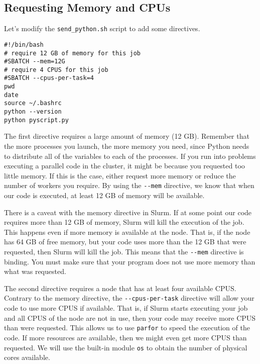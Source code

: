\documentclass[12pt, a4paper]{article}
\begin{document}
\subsection{Requesting Memory and CPUs}
\label{sec:orgc59627c}
Let's modify the \texttt{send\_python.sh} script to add some directives.
\lstset{language=bash,label= ,caption= ,captionpos=b,firstnumber=1,numbers=left,style=bash}
\begin{lstlisting}
#!/bin/bash
# require 12 GB of memory for this job
#SBATCH --mem=12G
# require 4 CPUS for this job
#SBATCH --cpus-per-task=4
pwd
date
source ~/.bashrc
python --version
python pyscript.py
\end{lstlisting}
The first directive requires a large amount of memory (12 GB).
Remember that the more processes you launch, the more memory you need, since Python needs to distribute all of the variables to each of the processes.
If you run into problems executing a parallel code in the cluster, it might be because you requested too little memory.
If this is the case, either request more memory or reduce the number of workers you require.
By using the \texttt{-{}-mem} directive, we know that when our code is executed, at least 12 GB of memory will be available.

There is a caveat with the memory directive in Slurm.
If at some point our code requires more than 12 GB of memory, Slurm will kill the execution of the job.
This happens even if more memory is available at the node.
That is, if the node has 64 GB of free memory, but  your code uses more than the 12 GB that were requested, then Slurm will kill the job.
This means that the \texttt{-{}-mem} directive is binding.
You must make sure that your program does not use more memory than what was requested.

The second directive requires a node that has at least four available CPUS.
Contrary to the memory directive, the \texttt{-{}-cpus-per-task} directive will allow your code to use more CPUS if available.
That is, if Slurm starts executing your job and all CPUS of the node are not in use, then your code may receive more CPUS than were requested.
This allows us to use \texttt{parfor} to speed the execution of the code.
If more resources are available, then we might even get more CPUS than requested.
We will use the built-in module \texttt{os} to obtain the number of physical cores available.
\end{document}

